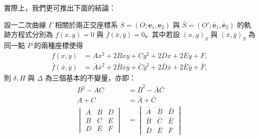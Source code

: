 實際上，我們更可推出下面的結論：

\begin{theorem}[剛性運動下不變量定理]
設一二次曲線 $\Gamma$ 相關於兩正交座標系 $S = (O; \mathbf{e}_1, \mathbf{e}_2)$ 與 $\bar{S} = (O'; \bar{\mathbf{e}}_1, \bar{\mathbf{e}}_2)$ 的軌跡方程式分別為 $f(x, y) = 0$ 與 $\bar{f}(\bar{x}, \bar{y}) = 0$。其中若設 $(x, y)_S$ 與 $(\bar{x}, \bar{y})_{\bar{S}}$ 為同一點 $P$ 的兩種座標使得
\begin{align*}
f(x, y) &= Ax^2 + 2Bxy + Cy^2 + 2Dx + 2Ey + F, \\
\bar{f}(\bar{x}, \bar{y}) &= \bar{A}\bar{x}^2 + 2\bar{B}\bar{x}\bar{y} + \bar{C}\bar{y}^2 + 2\bar{D}\bar{x} + 2\bar{E}\bar{y} + \bar{F},
\end{align*}
則 $\delta, H$ 與 $\Delta$ 為三個基本的不變量，亦即：
\begin{equation}
\begin{aligned}
B^2 - AC &= \bar{B}^2 - \bar{A}\bar{C} \\
A + C &= \bar{A} + \bar{C} \\
\begin{vmatrix} A & B & D \\ B & C & E \\ D & E & F \end{vmatrix} &= \begin{vmatrix} \bar{A} & \bar{B} & \bar{D} \\ \bar{B} & \bar{C} & \bar{E} \\ \bar{D} & \bar{E} & \bar{F} \end{vmatrix}
\end{aligned}
\label{eq:b4-ch4-thm3-invariants}
\end{equation}
\end{theorem}

